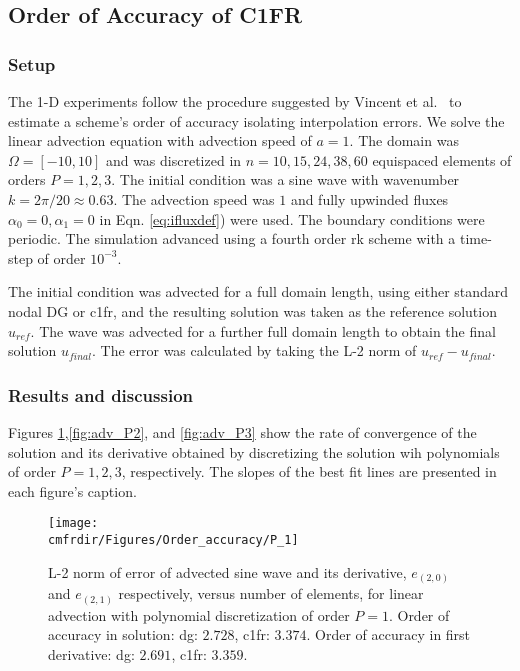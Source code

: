 \subsection{Order of Accuracy of C1FR}
\subsubsection{Setup}

The 1-D experiments follow the procedure suggested by Vincent et al.~\cite{vincent2011insights} to estimate  a scheme's order of accuracy isolating interpolation errors. We solve the linear advection equation with advection speed of $a = 1$. The domain was $\Omega = [-10, 10]$ and was discretized in $n = 10, 15, 24, 38, 60$ equispaced elements of orders $P = 1,2,3$. The initial condition was a sine wave with wavenumber $k = 2\pi/20 \approx 0.63$. The advection speed was $1$ and fully upwinded fluxes $\alpha_0 = 0, \alpha_1 = 0$ in Eqn. \eqref{eq:ifluxdef}) were used. The boundary conditions were periodic. The simulation advanced using a fourth order \gls{rk} scheme with a time-step of order $10^{-3}$.

The initial condition was advected for a full domain length, using either standard nodal DG or \gls{c1fr}, and the resulting solution was taken as the reference solution $u_{ref}$. The wave was advected for a further full domain length to obtain the final solution $u_{final}$. The error was calculated by taking the L-2 norm of $u_{ref} - u_{final}$.

\subsubsection{Results and discussion}
Figures \ref{fig:adv_P1},\ref{fig:adv_P2}, and \ref{fig:adv_P3} show the rate of convergence of the solution and its derivative obtained by discretizing the solution wih polynomials of order $P = 1,2,3$, respectively. The slopes of the best fit lines are presented in each figure's caption.

\begin{figure}[h]
\centering\texttt{[image: \\cmfrdir/Figures/Order\_accuracy/P\_1]}
\caption{L-2 norm of error of advected sine wave and its derivative, $e_{(2,0)}$ and $e_{(2,1)}$ respectively, versus number of elements, for linear advection with polynomial discretization of order $P = 1$. Order of accuracy in solution: \gls{dg}: $2.728$, \gls{c1fr}: $3.374$. Order of accuracy in first derivative: \gls{dg}: $2.691$, \gls{c1fr}: $3.359$.}
\label{fig:adv_P1}
\end{figure}

